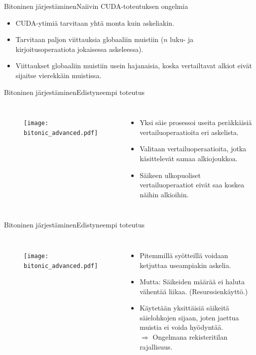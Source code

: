 \documentclass{beamer}
\begin{document}
\begin{frame}{Bitoninen järjestäminen}{Naiivin CUDA-toteutuksen ongelmia}
    \begin{itemize}
      \item CUDA-ytimiä tarvitaan yhtä monta kuin askeliakin.
      \item Tarvitaan paljon viittauksia globaaliin muistiin ($n$ luku- ja kirjoitusoperaatiota jokaisessa askeleessa).
      \item Viittaukset globaaliin muistiin usein hajanaisia, koska vertailtavat alkiot eivät sijaitse vierekkäin muistissa.
    \end{itemize}
\end{frame}

\begin{frame}{Bitoninen järjestäminen}{Edistyneempi toteutus}
\begin{columns}
    \begin{figure}
        \texttt{[image: bitonic\_advanced.pdf]}
    \end{figure}
    \begin{itemize}
      \item
        Yksi säie prosessoi useita peräkkäisiä vertailuoperaatioita eri askelista.
      \item
        Valitaan vertailuoperaatioita, jotka käsittelevät samaa alkiojoukkoa.
      \item
        Säikeen ulkopuoliset vertailuoperaatiot eivät saa koskea näihin alkioihin.
    \end{itemize}
\end{columns}
\end{frame}

\begin{frame}{Bitoninen järjestäminen}{Edistyneempi toteutus}
\begin{columns}
    \begin{figure}
        \texttt{[image: bitonic\_advanced.pdf]}
    \end{figure}
    \begin{itemize}
      \item
        Pitemmillä syötteillä voidaan ketjuttaa useampiakin askelia.
      \item
        Mutta: Säikeiden määrää ei haluta vähentää liikaa. (Resurssienkäyttö.)
      \item
        Käytetään yksittäisiä säikeitä säielohkojen sijaan, joten jaettua muistia ei voida hyödyntää. \\ $\Rightarrow$ Ongelmana rekisteritilan rajallisuus.
    \end{itemize}
\end{columns}
\end{frame}
\end{document}
